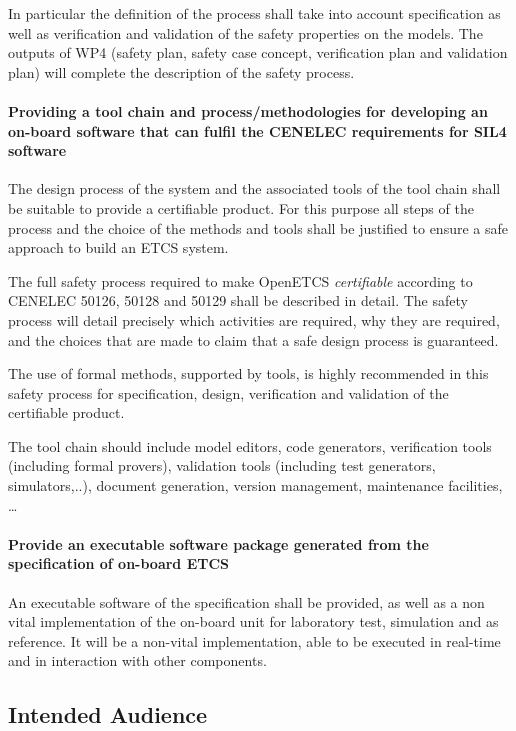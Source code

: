 \documentclass{template/openetcs_article}
\begin{document}
In particular the definition of the process shall take into account specification as well as verification and validation of the safety properties on the models. The outputs of WP4 (safety plan, safety case concept, verification plan and validation plan) will complete the description of the safety process.


\paragraph{Providing a tool chain and process/methodologies for developing
an on-board software that can fulfil the CENELEC requirements for SIL4 software}

The design process of the system and the associated tools of the tool chain shall be suitable to provide a certifiable product. For this purpose all steps of the process and the choice of the methods and tools shall be justified to ensure a safe approach to build an ETCS system.

The full safety process required to make OpenETCS \emph{certifiable} according to CENELEC 50126, 50128 and 50129 shall be described in detail. The safety process will detail precisely which activities are required, why they are required, and the choices that are made to claim that a safe design process is guaranteed.

The use of formal methods, supported by tools, is highly recommended in this safety process for specification, design, verification and validation of the certifiable product.

The tool chain should include model editors, code generators, verification tools (including formal provers), validation tools (including test generators, simulators,..), document generation, version management, maintenance facilities, \dots

\paragraph{Provide an executable software package generated from the specification of on-board ETCS}

An executable software of the specification shall be provided, as well as a non vital implementation of the on-board unit for laboratory test, simulation and as reference. It will be a non-vital  implementation, able to be executed in real-time and in interaction with other components.


\subsection{Intended Audience}
\end{document}

